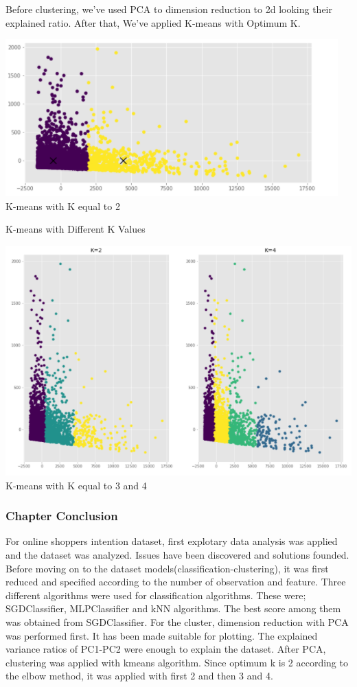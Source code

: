 \documentclass[onecolumn]{article}
\begin{document}
Before clustering, we've used PCA to dimension reduction to 2d looking their explained ratio. After that, We've applied K-means with Optimum K. 

\begin{center}
    \includegraphics[width=.8\textwidth]{kmeans1.PNG}\\
    K-means with K equal to 2
\end{center}

K-means with Different K Values

\begin{center}
    \includegraphics[width=.8\textwidth]{kmeans2.PNG}\\
    K-means with K equal to 3 and 4
\end{center}

\maketitle


\subsubsection{Chapter Conclusion}

For online shoppers intention dataset, first explotary data analysis was applied and the dataset was analyzed. Issues have been discovered and solutions founded. Before moving on to the dataset models(classification-clustering), it was first reduced and specified according to the number of observation and feature. Three different algorithms were used for classification algorithms. These were; SGDClassifier, MLPClassifier and kNN algorithms. The best score among them was obtained from SGDClassifier. For the cluster, dimension reduction with PCA was performed first. It has been made suitable for plotting. The explained variance ratios of PC1-PC2 were enough to explain the dataset. After PCA, clustering was applied with kmeans algorithm. Since optimum k is 2 according to the elbow method, it was applied with first 2 and then 3 and 4.
\end{document}
